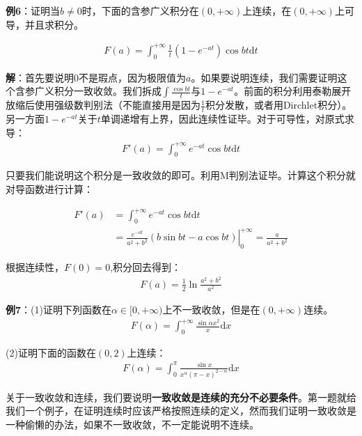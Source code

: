 \documentclass{ctexart}
\let\oldtextbf\textbf
\renewcommand{\textbf}[1]{\textcolor{brown!50!red}{\oldtextbf{#1}}}
\begin{document}
\textbf{\color{brown!50!red}例6}：证明当$b\neq 0$时，下面的含参广义积分在$(0,+\infty)$上连续，在$(0,+\infty)$上可导，并且求积分。

\begin{align*}
    F(a)=\int_0^{+\infty}\frac{1}{t}(1-e^{-at})\cos bt\mathrm{d}t
\end{align*}

\textbf{\color{brown!50!red}解}：首先要说明$0$不是瑕点，因为极限值为$a$。如果要说明连续，我们需要证明这个含参广义积分一致收敛。我们拆成$\int\frac{\cos bt}{t}$与$1-e^{-at}$。前面的积分利用泰勒展开放缩后使用强级数判别法（不能直接用是因为$\frac{1}{t}$积分发散，或者用Dirchlet积分）。另一方面$1-e^{-at}$关于$t$单调递增有上界，因此连续性证毕。对于可导性，对原式求导：
\begin{align*}
F'(a)=\int_0^{+\infty} e^{-at}\cos bt\mathrm{d}t
\end{align*}

只要我们能说明这个积分是一致收敛的即可。利用M判别法证毕。计算这个积分就对导函数进行计算：

\begin{align*}
F'(a)&=\int_0^{+\infty} e^{-at}\cos bt\mathrm{d}t\\
&=\left.\frac{e^{-at}}{a^2+b^2} (b\sin bt-a\cos bt)\right|_0^{+\infty}=\frac{a}{a^2+b^2} 
\end{align*}

根据连续性，$F(0)=0$,积分回去得到：
\begin{align*}
    F(a)=\frac{1}{2}\ln\frac{a^2+b^2}{a^2}
\end{align*}

\textbf{\color{brown!50!red}例7}：(1)证明下列函数在$\alpha\in[0,+\infty)$上不一致收敛，但是在$(0,+\infty)$连续。
\begin{align*}
    F(\alpha)=\int_0^{+\infty}\frac{\sin \alpha x^2}{x}\mathrm{d}x
\end{align*}

(2)证明下面的函数在$(0,2)$上连续：
\begin{align*}
    F(\alpha)=\int_0^\pi \frac{\sin  x}{x^\alpha (\pi-x)^{2-\alpha}}\mathrm{d}x
\end{align*}
\begin{tcolorbox}[
    colback=bac1,     %
    colframe=fra1,   %
    coltitle=white!80,    
    coltext=tex1,%
    title=关于一致收敛和连续的关系,
    fonttitle=\bfseries,        %
arc=2mm,                     %
breakable
]
关于一致收敛和连续，我们要说明\textbf{\color{brown!50!red}一致收敛是连续的充分不必要条件}。第一题就给我们一个例子，在证明连续时应该严格按照连续的定义，然而我们证明一致收敛是一种偷懒的办法，如果不一致收敛，不一定能说明不连续。
\end{tcolorbox}
\end{document}
